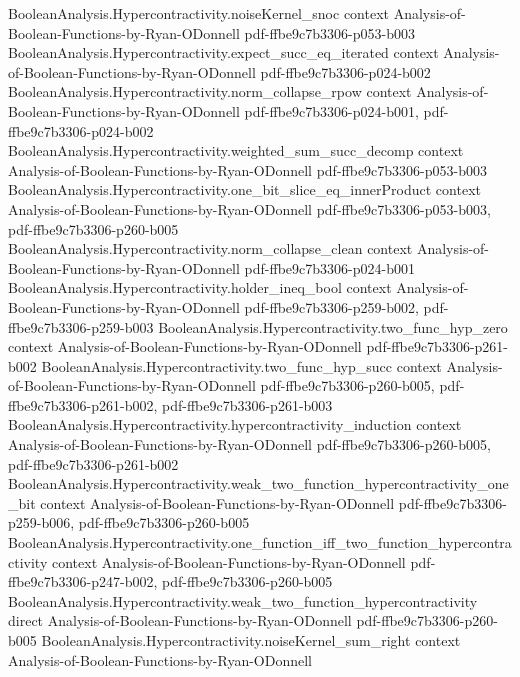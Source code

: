 \begin{theorem}
\proofstep
  {BooleanAnalysis.Hypercontractivity.noiseKernel_snoc}
  {context}
  {Analysis-of-Boolean-Functions-by-Ryan-ODonnell}
  {pdf-ffbe9c7b3306-p053-b003}
\proofstep
  {BooleanAnalysis.Hypercontractivity.expect_succ_eq_iterated}
  {context}
  {Analysis-of-Boolean-Functions-by-Ryan-ODonnell}
  {pdf-ffbe9c7b3306-p024-b002}
\proofstep
  {BooleanAnalysis.Hypercontractivity.norm_collapse_rpow}
  {context}
  {Analysis-of-Boolean-Functions-by-Ryan-ODonnell}
  {pdf-ffbe9c7b3306-p024-b001,
    pdf-ffbe9c7b3306-p024-b002}
\proofstep
  {BooleanAnalysis.Hypercontractivity.weighted_sum_succ_decomp}
  {context}
  {Analysis-of-Boolean-Functions-by-Ryan-ODonnell}
  {pdf-ffbe9c7b3306-p053-b003}
\proofstep
  {BooleanAnalysis.Hypercontractivity.one_bit_slice_eq_innerProduct}
  {context}
  {Analysis-of-Boolean-Functions-by-Ryan-ODonnell}
  {pdf-ffbe9c7b3306-p053-b003,
    pdf-ffbe9c7b3306-p260-b005}
\proofstep
  {BooleanAnalysis.Hypercontractivity.norm_collapse_clean}
  {context}
  {Analysis-of-Boolean-Functions-by-Ryan-ODonnell}
  {pdf-ffbe9c7b3306-p024-b001}
\proofstep
  {BooleanAnalysis.Hypercontractivity.holder_ineq_bool}
  {context}
  {Analysis-of-Boolean-Functions-by-Ryan-ODonnell}
  {pdf-ffbe9c7b3306-p259-b002,
    pdf-ffbe9c7b3306-p259-b003}
\proofstep
  {BooleanAnalysis.Hypercontractivity.two_func_hyp_zero}
  {context}
  {Analysis-of-Boolean-Functions-by-Ryan-ODonnell}
  {pdf-ffbe9c7b3306-p261-b002}
\proofstep
  {BooleanAnalysis.Hypercontractivity.two_func_hyp_succ}
  {context}
  {Analysis-of-Boolean-Functions-by-Ryan-ODonnell}
  {pdf-ffbe9c7b3306-p260-b005,
    pdf-ffbe9c7b3306-p261-b002,
    pdf-ffbe9c7b3306-p261-b003}
\proofstep
  {BooleanAnalysis.Hypercontractivity.hypercontractivity_induction}
  {context}
  {Analysis-of-Boolean-Functions-by-Ryan-ODonnell}
  {pdf-ffbe9c7b3306-p260-b005,
    pdf-ffbe9c7b3306-p261-b002}
\proofstep
  {BooleanAnalysis.Hypercontractivity.weak_two_function_hypercontractivity_one_bit}
  {context}
  {Analysis-of-Boolean-Functions-by-Ryan-ODonnell}
  {pdf-ffbe9c7b3306-p259-b006,
    pdf-ffbe9c7b3306-p260-b005}
\proofstep
  {BooleanAnalysis.Hypercontractivity.one_function_iff_two_function_hypercontractivity}
  {context}
  {Analysis-of-Boolean-Functions-by-Ryan-ODonnell}
  {pdf-ffbe9c7b3306-p247-b002,
    pdf-ffbe9c7b3306-p260-b005}
\proofstep
  {BooleanAnalysis.Hypercontractivity.weak_two_function_hypercontractivity}
  {direct}
  {Analysis-of-Boolean-Functions-by-Ryan-ODonnell}
  {pdf-ffbe9c7b3306-p260-b005}
\proofstep
  {BooleanAnalysis.Hypercontractivity.noiseKernel_sum_right}
  {context}
  {Analysis-of-Boolean-Functions-by-Ryan-ODonnell}

\end{theorem}
